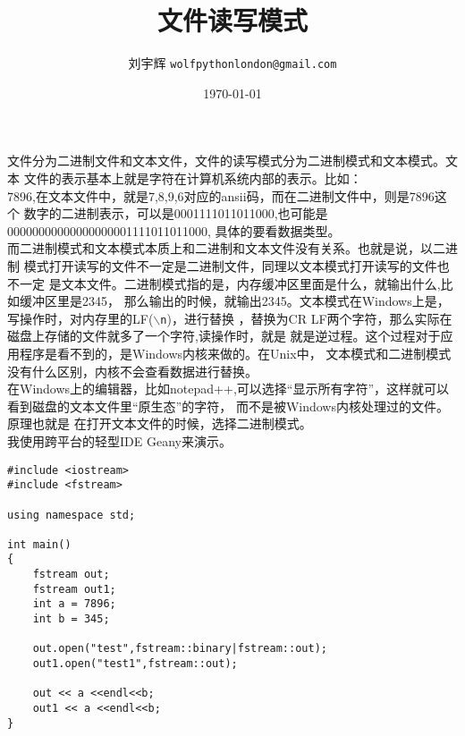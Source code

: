 \documentclass[11pt]{article}
\title{文件读写模式}
\author{刘宇辉 \texttt{wolfpythonlondon@gmail.com}}
\date{\today}
\begin{document}
\maketitle

文件分为二进制文件和文本文件，文件的读写模式分为二进制模式和文本模式。文本
文件的表示基本上就是字符在计算机系统内部的表示。比如：\\
7896,在文本文件中，就是7,8,9,6对应的ansii码，而在二进制文件中，则是7896这个
数字的二进制表示，可以是0001111011011000,也可能是00000000000000000001111011011000,
具体的要看数据类型。\\

而二进制模式和文本模式本质上和二进制和文本文件没有关系。也就是说，以二进制
模式打开读写的文件不一定是二进制文件，同理以文本模式打开读写的文件也不一定
是文本文件。二进制模式指的是，内存缓冲区里面是什么，就输出什么,比如缓冲区里是2345，
那么输出的时候，就输出2345。文本模式在Windows上是，写操作时，对内存里的LF(\texttt{$\backslash$n})，进行替换
，替换为CR
LF两个字符，那么实际在磁盘上存储的文件就多了一个字符,读操作时，就是
就是逆过程。这个过程对于应用程序是看不到的，是Windows内核来做的。在Unix中，
文本模式和二进制模式没有什么区别，内核不会查看数据进行替换。\\

在Windows上的编辑器，比如notepad++,可以选择“显示所有字符”，这样就可以看到磁盘的文本文件里“原生态”的字符，
而不是被Windows内核处理过的文件。原理也就是
在打开文本文件的时候，选择二进制模式。\\

我使用跨平台的轻型IDE Geany来演示。



%
\begin{lstlisting}[name=test.cpp]
#include <iostream>
#include <fstream>

using namespace std;

int main()
{
	fstream out;
	fstream out1;
	int a = 7896;
	int b = 345;

	out.open("test",fstream::binary|fstream::out);
	out1.open("test1",fstream::out);

	out << a <<endl<<b;
	out1 << a <<endl<<b;
}
\end{lstlisting}
\end{document}
